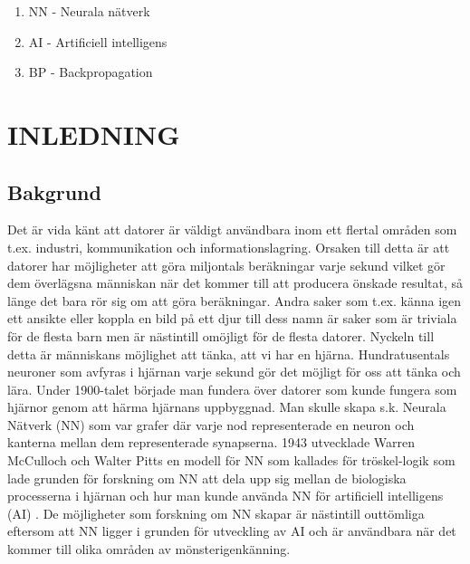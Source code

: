 \documentclass[a4paper,10pt]{article}
\begin{document}
\begin{enumerate}[noitemsep]
\item NN - Neurala nätverk
\item AI - Artificiell intelligens
\item BP - Backpropagation
\end{enumerate}

\section{INLEDNING}





\subsection{Bakgrund}

Det är vida känt att datorer är väldigt användbara inom ett flertal områden som t.ex. industri, kommunikation och informationslagring. Orsaken till detta är att datorer har möjligheter att göra miljontals beräkningar varje sekund vilket gör dem överlägsna människan när det kommer till att producera önskade resultat, så länge det bara rör sig om att göra beräkningar. Andra saker som t.ex. känna igen ett ansikte eller koppla en bild på ett djur till dess namn är saker som är triviala för de flesta barn men är nästintill omöjligt för de flesta datorer. Nyckeln till detta är människans möjlighet att tänka, att vi har en hjärna. Hundratusentals neuroner som avfyras i hjärnan varje sekund gör det möjligt för oss att tänka och lära. Under 1900-talet började man fundera över datorer som kunde fungera som hjärnor genom att härma hjärnans uppbyggnad. Man skulle skapa s.k. Neurala Nätverk (NN) som var grafer där varje nod representerade en neuron och kanterna mellan dem representerade synapserna. 1943 utvecklade Warren McCulloch och Walter Pitts en modell för NN som kallades för tröskel-logik som lade grunden för forskning om NN att dela upp sig mellan de biologiska processerna i hjärnan och hur man kunde använda NN för artificiell intelligens (AI) \autocite{NNhistory}. De möjligheter som forskning om NN skapar är nästintill outtömliga eftersom att NN ligger i grunden för utveckling av AI och är användbara när det kommer till olika områden av mönsterigenkänning.
\end{document}
